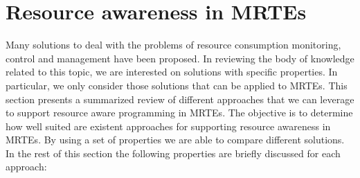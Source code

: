 \section{Resource awareness in MRTEs} \label{sec:resource-awareness-related-work}

Many solutions to deal with the problems of resource consumption monitoring, control and management have been proposed.
In reviewing the body of knowledge related to this topic, we are interested on solutions with specific properties.
In particular, we only consider those solutions that can be applied to MRTEs.
This section presents a summarized review of different approaches that we can leverage to support resource aware programming in MRTEs.
The objective is to determine how well suited are existent approaches for supporting resource awareness in MRTEs.
By using a set of properties we are able to compare different solutions.
In the rest of this section the following properties are briefly discussed for each approach: 

